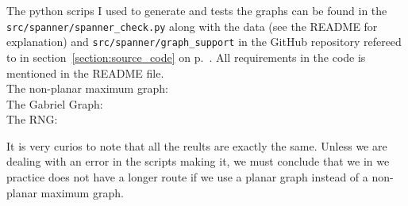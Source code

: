 The python scrips I used to generate and tests the graphs can be found in the \texttt{src/spanner/spanner\_check.py} along with the data (see the README for explanation) and \texttt{src/spanner/graph\_support} in the GitHub repository refereed to in section~\ref{section:source_code} on p.~\pageref{section:source_code}. All requirements in the code is mentioned in the README file.\\

The non-planar maximum graph:
\\

The Gabriel Graph:
\\

The RNG:


It is very curios to note that all the reults are exactly the same. Unless we are dealing with an error in the scripts making it, we must conclude that we in we practice does not have a longer route if we use a planar graph instead of a non-planar maximum graph.
